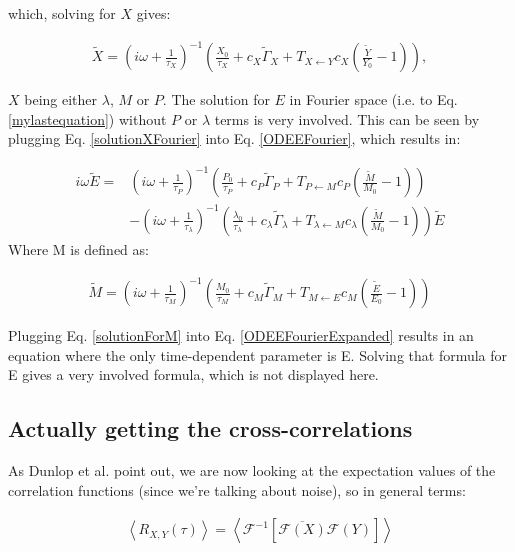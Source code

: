 \documentclass[a4paper,twoside,10pt]{report}
\begin{document}
which, solving for $X$ gives:

\begin{align}
\label{solutionXFourier}
\tilde{X} = \left( i \omega + \frac{1}{\tau_X} \right)^{-1} \left( \frac{X_0}{\tau_X} + c_X \tilde{\Gamma}_X + T_{X \leftarrow Y} c_X (\frac{\tilde{Y}}{Y_0} - 1) \right)
,
\end{align}

$X$ being either $\lambda$, $M$ or $P$.
%
The solution for $E$ in Fourier space (i.e. to Eq. \ref{mylastequation}) without $P$ or $\lambda$ terms is very involved. This can be seen by plugging Eq. \ref{solutionXFourier} into Eq. \ref{ODEEFourier}, which results in:

\begin{align}
\label{ODEEFourierExpanded}
i\omega \tilde{E} = & 
\left( i \omega + \frac{1}{\tau_P} \right)^{-1} \left( \frac{P_0}{\tau_P} + c_P \tilde{\Gamma}_P + T_{P \leftarrow M} c_P (\frac{\tilde{M}}{M_0} - 1) \right)
     \nonumber \\
    & -
    \left( i \omega + \frac{1}{\tau_\lambda} \right)^{-1} \left( \frac{\lambda_0}{\tau_\lambda} + c_\lambda \tilde{\Gamma}_\lambda + T_{\lambda \leftarrow M} c_\lambda (\frac{\tilde{M}}{M_0} - 1) \right)
     \tilde{E}
\end{align}
Where M is defined as:

\begin{align}
\label{solutionForM}
\tilde{M} = \left( i \omega + \frac{1}{\tau_M} \right)^{-1} \left( \frac{M_0}{\tau_M} + c_M \tilde{\Gamma}_M + T_{M \leftarrow E} c_M (\frac{\tilde{E}}{E_0} - 1) \right)
\end{align}

Plugging Eq. \ref{solutionForM} into Eq. \ref{ODEEFourierExpanded} results in an equation where the only time-dependent parameter is E.
Solving that formula for E gives a very involved formula, which is not displayed here.

\subsection{Actually getting the cross-correlations}

As Dunlop et al. point out, we are now looking at the expectation values of the correlation functions (since we're talking about noise), so in general terms:

\begin{align}
\left< R_{X,Y}(\tau)\right > = 
\left< \mathcal{F}^{-1} \left[ \overline{\mathcal{F} (X)} \mathcal{F}(Y) \right] \right>
\end{align}
\end{document}
